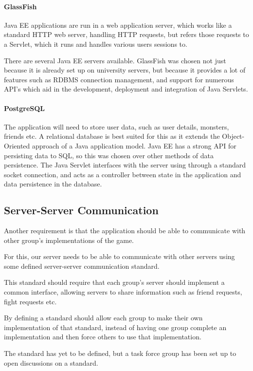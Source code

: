 \documentclass{article}
\begin{document}
\paragraph{GlassFish}

Java EE applications are run in a web application server, which works like a standard HTTP web server, handling HTTP requests, but refers those requests to a Servlet, which it runs and handles various users sessions to.

There are several Java EE servers available. GlassFish was chosen not just because it is already set up on university servers, but because it provides a lot of features such as RDBMS connection management, and support for numerous API's which aid in the development, deployment and integration of Java Servlets.

\paragraph{PostgreSQL}

The application will need to store user data, such as user details, monsters, friends etc.
A relational database is best suited for this as it extends the Object-Oriented approach of a Java application model.
Java EE has a strong API for persisting data to SQL, so this was chosen over other methods of data persistence.
The Java Servlet interfaces with the server using through a standard socket connection, and acts as a controller between state in the application and data persistence in the database.


\subsection{Server-Server Communication}

Another requirement is that the application should be able to communicate with other group's implementations of the game.

For this, our server needs to be able to communicate with other servers using some defined server-server communication standard.

This standard should require that each group's server should implement a common interface, allowing servers to share information such as friend requests, fight requests etc.

By defining a standard should allow each group to make their own implementation of that standard, instead of having one group complete an implementation and then force others to use that implementation.

The standard has yet to be defined, but a task force group has been set up to open discussions on a standard.
\end{document}
